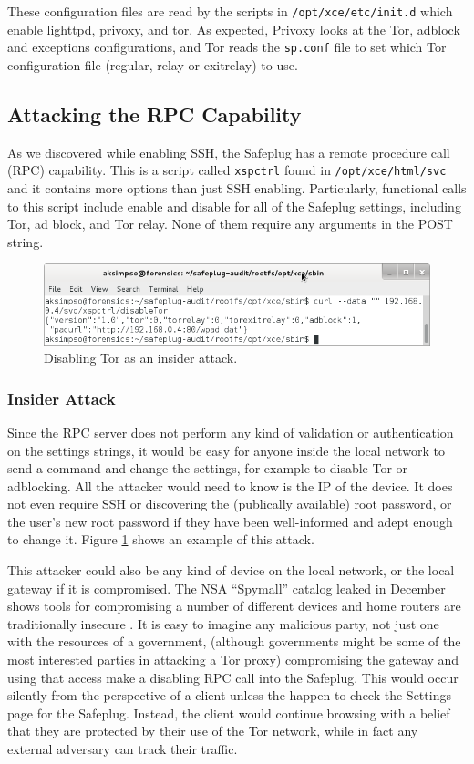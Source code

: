 These configuration files are read by the scripts in \verb!/opt/xce/etc/init.d! which enable lighttpd, privoxy, and tor.  As expected, Privoxy looks at the Tor, adblock and exceptions configurations, and Tor reads the \verb!sp.conf! file to set which Tor configuration file (regular, relay or exitrelay) to use.

\subsection{Attacking the RPC Capability}
As we discovered while enabling SSH, the Safeplug has a remote procedure call (RPC) capability.  This is a script called \verb!xspctrl! found in \verb!/opt/xce/html/svc! and it contains more options than just SSH enabling.  Particularly, functional calls to this script include enable and disable for all of the Safeplug settings, including Tor, ad block, and Tor relay.  None of them require any arguments in the POST string.

\begin{figure}[htb]
\begin{center}
\includegraphics[width=.75\textwidth]{disabletor}
\caption{Disabling Tor as an insider attack.}
\label{disable}
\end{center}
\end{figure}

\subsubsection{Insider Attack}
Since the RPC server does not perform any kind of validation or authentication on the settings strings, it would be easy for anyone inside the local network to send a command and change the settings, for example to disable Tor or adblocking.  All the attacker would need to know is the IP of the device.  It does not even require SSH or discovering the (publically available) root password, or the user's new root password if they have been well-informed and adept enough to change it.  Figure \ref{disable} shows an example of this attack.

This attacker could also be any kind of device on the local network, or the local gateway if it is compromised.  The NSA ``Spymall'' catalog leaked in December shows tools for compromising a number of different devices and home routers are traditionally insecure \cite{spymall}.  It is easy to imagine any malicious party, not just one with the resources of a government, (although governments might be some of the most interested parties in attacking a Tor proxy) compromising the gateway and using that access make a disabling RPC call into the Safeplug.  This would occur silently from the perspective of a client unless the happen to check the Settings page for the Safeplug.  Instead, the client would continue browsing with a belief that they are protected by their use of the Tor network, while in fact any external adversary can track their traffic.

